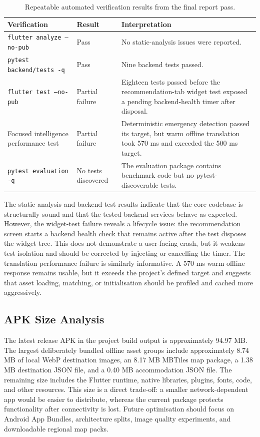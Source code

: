 \documentclass[12pt,a4paper,oneside]{report}
\begin{document}
\begin{table}[h]
\centering
\small
\begin{tabular}{p{5cm}p{2.2cm}p{6cm}}
\toprule
\textbf{Verification} & \textbf{Result} & \textbf{Interpretation} \\
\midrule
\texttt{flutter analyze --no-pub} & Pass & No static-analysis issues were reported. \\
\texttt{pytest backend/tests -q} & Pass & Nine backend tests passed. \\
\texttt{flutter test --no-pub} & Partial failure & Eighteen tests passed before the recommendation-tab widget test exposed a pending backend-health timer after disposal. \\
Focused intelligence performance test & Partial failure & Deterministic emergency detection passed its target, but warm offline translation took 570 ms and exceeded the 500 ms target. \\
\texttt{pytest evaluation -q} & No tests discovered & The evaluation package contains benchmark code but no pytest-discoverable tests. \\
\bottomrule
\end{tabular}
\caption{Repeatable automated verification results from the final report pass.}
\end{table}

The static-analysis and backend-test results indicate that the core codebase is structurally sound and that the tested backend services behave as expected. However, the widget-test failure reveals a lifecycle issue: the recommendation screen starts a backend health check that remains active after the test disposes the widget tree. This does not demonstrate a user-facing crash, but it weakens test isolation and should be corrected by injecting or cancelling the timer. The translation performance failure is similarly informative. A 570 ms warm offline response remains usable, but it exceeds the project's defined target and suggests that asset loading, matching, or initialisation should be profiled and cached more aggressively.

\subsection{APK Size Analysis}

The latest release APK in the project build output is approximately 94.97 MB. The largest deliberately bundled offline asset groups include approximately 8.74 MB of local WebP destination images, an 8.17 MB MBTiles map package, a 1.38 MB destination JSON file, and a 0.40 MB accommodation JSON file. The remaining size includes the Flutter runtime, native libraries, plugins, fonts, code, and other resources. This size is a direct trade-off: a smaller network-dependent app would be easier to distribute, whereas the current package protects functionality after connectivity is lost. Future optimisation should focus on Android App Bundles, architecture splits, image quality experiments, and downloadable regional map packs.
\end{document}
